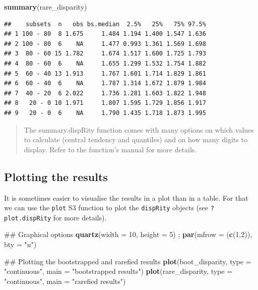 \documentclass[]{book}
\newenvironment{Shaded}{\begin{snugshade}}{\end{snugshade}}
\newcommand{\KeywordTok}[1]{\textcolor[rgb]{0.13,0.29,0.53}{\textbf{#1}}}
\newcommand{\DataTypeTok}[1]{\textcolor[rgb]{0.13,0.29,0.53}{#1}}
\newcommand{\DecValTok}[1]{\textcolor[rgb]{0.00,0.00,0.81}{#1}}
\newcommand{\StringTok}[1]{\textcolor[rgb]{0.31,0.60,0.02}{#1}}
\newcommand{\NormalTok}[1]{#1}
\theoremstyle{definition}
\theoremstyle{definition}
\theoremstyle{remark}
\begin{document}
\begin{Shaded}
\begin{Highlighting}[]
\KeywordTok{summary}\NormalTok{(rare_disparity)}
\end{Highlighting}
\end{Shaded}

\begin{verbatim}
##    subsets  n   obs bs.median  2.5%   25%   75% 97.5%
## 1 100 - 80  8 1.675     1.484 1.194 1.400 1.547 1.636
## 2 100 - 80  6    NA     1.477 0.993 1.361 1.569 1.698
## 3  80 - 60 15 1.782     1.674 1.517 1.600 1.725 1.793
## 4  80 - 60  6    NA     1.655 1.299 1.532 1.754 1.882
## 5  60 - 40 13 1.913     1.767 1.601 1.714 1.829 1.861
## 6  60 - 40  6    NA     1.787 1.314 1.672 1.879 1.984
## 7  40 - 20  6 2.022     1.736 1.281 1.603 1.822 1.948
## 8   20 - 0 10 1.971     1.807 1.595 1.729 1.856 1.917
## 9   20 - 0  6    NA     1.790 1.435 1.718 1.873 1.995
\end{verbatim}

\begin{quote}
The summary.dispRity function comes with many options on which values to
calculate (central tendency and quantiles) and on how many digits to
display. Refer to the function's manual for more details.
\end{quote}

\subsection{Plotting the results}\label{plotting-the-results}

It is sometimes easier to visualise the results in a plot than in a
table. For that we can use the \texttt{plot} S3 function to plot the
\texttt{dispRity} objects (see \texttt{?plot.dispRity} for more
details).

\begin{Shaded}
\begin{Highlighting}[]
\NormalTok{## Graphical options}
\KeywordTok{quartz}\NormalTok{(}\DataTypeTok{width =} \DecValTok{10}\NormalTok{, }\DataTypeTok{height =} \DecValTok{5}\NormalTok{) ; }\KeywordTok{par}\NormalTok{(}\DataTypeTok{mfrow =}\NormalTok{ (}\KeywordTok{c}\NormalTok{(}\DecValTok{1}\NormalTok{,}\DecValTok{2}\NormalTok{)), }\DataTypeTok{bty =} \StringTok{"n"}\NormalTok{)}

\NormalTok{## Plotting the bootstrapped and rarefied results}
\KeywordTok{plot}\NormalTok{(boot_disparity, }\DataTypeTok{type =} \StringTok{"continuous"}\NormalTok{, }\DataTypeTok{main =} \StringTok{"bootstrapped results"}\NormalTok{)}
\KeywordTok{plot}\NormalTok{(rare_disparity, }\DataTypeTok{type =} \StringTok{"continuous"}\NormalTok{, }\DataTypeTok{main =} \StringTok{"rarefied results"}\NormalTok{)}
\end{Highlighting}
\end{Shaded}
\end{document}
